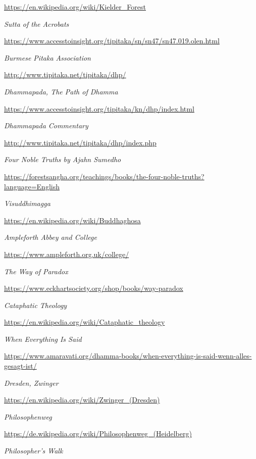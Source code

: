 \begin{thebibliography}{9}
  {\urlsize \url{https://en.wikipedia.org/wiki/Kielder_Forest}}

 \emph{Sutta of the Acrobats}

  {\urlsize \url{https://www.accesstoinsight.org/tipitaka/sn/sn47/sn47.019.olen.html}}

 \emph{Burmese Pitaka Association}

  {\urlsize \url{http://www.tipitaka.net/tipitaka/dhp/}}

 \emph{Dhammapada, The Path of Dhamma}

  {\urlsize \url{https://www.accesstoinsight.org/tipitaka/kn/dhp/index.html}}

 \emph{Dhammapada Commentary}

  {\urlsize \url{http://www.tipitaka.net/tipitaka/dhp/index.php}}

 \emph{Four Noble Truths by Ajahn Sumedho}

  {\urlsize \url{https://forestsangha.org/teachings/books/the-four-noble-truths?language=English}}

 \emph{Visuddhimagga}

  {\urlsize \url{https://en.wikipedia.org/wiki/Buddhaghosa}}

 \emph{Ampleforth Abbey and College}

  {\urlsize \url{https://www.ampleforth.org.uk/college/}}

 \emph{The Way of Paradox}

  {\urlsize \url{https://www.eckhartsociety.org/shop/books/way-paradox}}

 \emph{Cataphatic Theology}

  {\urlsize \url{https://en.wikipedia.org/wiki/Cataphatic_theology}}

 \emph{When Everything Is Said}

  {\urlsize \url{https://www.amaravati.org/dhamma-books/when-everything-is-said-wenn-alles-gesagt-ist/}}

 \emph{Dresden, Zwinger}

  {\urlsize \url{https://en.wikipedia.org/wiki/Zwinger_(Dresden)}}

 \emph{Philosophenweg}

  {\urlsize \url{https://de.wikipedia.org/wiki/Philosophenweg_(Heidelberg)}}

 \emph{Philosopher's Walk}


\end{thebibliography}
